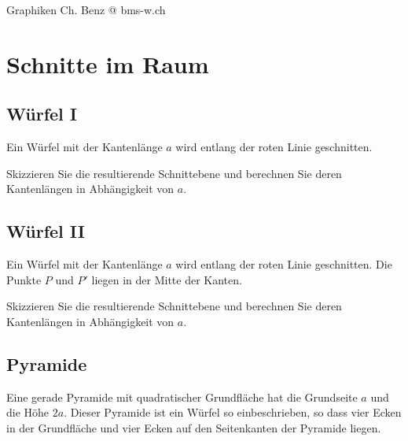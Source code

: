 



\usepackage{amssymb} %
\renewcommand{\metaHeaderLine}{Arbeitsblatt Stereometrie}
\renewcommand{\arbeitsblattTitel}{Schnitte im Raum}

\arbeitsblattHeader{}

Graphiken Ch. Benz @ bms-w.ch

\setcounter{aufgabennummer}{1}


\section{Schnitte im Raum}

\subsection{Würfel I}

Ein Würfel mit der Kantenlänge $a$ wird entlang der roten
Linie geschnitten.

Skizzieren Sie die resultierende Schnittebene und berechnen
Sie deren Kantenlängen in Abhängigkeit von $a$.


\subsection{Würfel II}


Ein Würfel mit der Kantenlänge $a$ wird entlang der roten Linie
geschnitten. Die Punkte $P$ und $P'$ liegen in der Mitte der Kanten.

Skizzieren Sie die resultierende Schnittebene und berechnen
Sie deren Kantenlängen in Abhängigkeit von $a$.


\subsection{Pyramide}
Eine gerade Pyramide mit quadratischer Grundfläche hat die
Grundseite $a$ und die Höhe $2a$. Dieser Pyramide ist ein Würfel
so einbeschrieben, so dass vier Ecken in der Grundfläche und
vier Ecken auf den Seitenkanten der Pyramide liegen.

